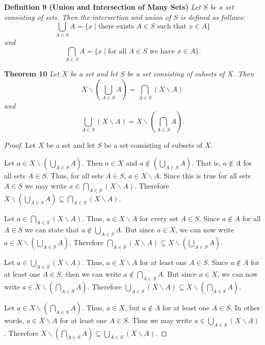 \documentclass{article}
\begin{document}
\begin{flushleft}
\textbf{Definition 9 (Union and Intersection of Many Sets)}
\textsl{Let $S$ be a set consisting of sets. Then the intersection and union of $S$ is defined as follows:
\[
\bigcup_{A \in S} A = \{x \mid \text{there exists } A \in S \text{ such that } x \in A\}
\]
and
\[
\bigcap_{A \in S} A = \{x \mid \text{for all } A \in S \text{ we have } x \in A\}.
\]} 

\textbf{Theorem 10}
\textsl{Let $X$ be a set and let $S$ be a set consisting of subsets of $X$. Then
\[
X \backslash \left( \bigcup_{A \in S} A \right) = \bigcap_{A \in S} \left(X \backslash A\right)
\]
and
\[
\bigcup_{A \in S} \left(X \backslash A\right)=X \backslash \left( \bigcap_{A \in S} A \right).
\]}

\begin{proof}
Let $X$ be a set and let $S$ be a set consisting of subsets of $X$.\newline

Let $a \in X \backslash \left( \bigcup_{A \in S} A \right)$. Then $a \in X$ and $a \notin \left( \bigcup_{A \in S} A \right)$. That is, $a \notin A$ for all sets $A \in S$. Thus, for all sets $A \in S$, $a \in X \backslash A$. Since this is true for all sets $A \in S$ we may write $x \in \bigcap_{A \in S} \left( X \backslash A \right)$. Therefore $X \backslash \left( \bigcup_{A \in S} A \right) \subseteq \bigcap_{A \in S} \left( X \backslash A \right)$.\newline

Let $a \in \bigcap_{A \in S} \left(X \backslash A \right)$. Thus, $a \in X \backslash A$ for every set  $A \in S$. Since $a \notin A$ for all $A \in S$ we can state that $a \notin \bigcup_{A \in S} A$. But since $a \in X$, we can now write $a \in X \backslash \left( \bigcup_{A \in S} A \right)$. Therefore $\bigcap_{A \in S} \left( X \backslash A \right) \subseteq X \backslash \left( \bigcup_{A \in S} A \right)$.\newline

Let $a \in \bigcup_{A \in S} \left( X \backslash A \right)$. Thus, $a \in X \backslash A$ for at least one $A \in S$. Since $ a \notin A$ for at least one $A \in S$, then we can write $ a \notin \bigcap_{A \in S} A$. But since $a \in X$, we can now write $a \in X \backslash \left( \bigcap_{A \in S} A \right)$. Therefore $\bigcup_{A \in S} \left( X \backslash A \right) \subseteq X \backslash \left( \bigcap_{A \in S} A \right)$.\newline

Let $a \in X \backslash \left( \bigcap_{A \in S} A \right)$. Thus, $a \in X$, but $a \notin A$ for at least one $A \in S$. In other words, $a \in X \backslash A$ for at least one $A \in S$. Thus we may write $a \in \bigcup_{A \in S} \left(X \backslash A \right)$. Therefore $X \backslash \left( \bigcap_{A \in S} A \right) \subseteq \bigcup_{A \in S} \left( X \backslash A \right)$.\newline


\end{proof}
\end{flushleft}
\end{document}
